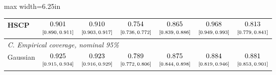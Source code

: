 \begin{table}[htbp]
\begin{adjustbox}{max width=6.25in}
\begin{tabular}{lcccccc}
HSCP & $\begin{array}{@{}c@{}}0.901\\[-1pt] \scriptstyle[0.890,\,0.911]\end{array}$ & $\begin{array}{@{}c@{}}0.910\\[-1pt] \scriptstyle[0.903,\,0.917]\end{array}$ & $\begin{array}{@{}c@{}}0.754\\[-1pt] \scriptstyle[0.736,\,0.772]\end{array}$ & $\begin{array}{@{}c@{}}0.865\\[-1pt] \scriptstyle[0.839,\,0.886]\end{array}$ & $\begin{array}{@{}c@{}}0.968\\[-1pt] \scriptstyle[0.949,\,0.993]\end{array}$ & $\begin{array}{@{}c@{}}0.813\\[-1pt] \scriptstyle[0.779,\,0.841]\end{array}$ \\
\midrule
\multicolumn{7}{l}{\textit{C. Empirical coverage, nominal 95\%}} \\
Gaussian & $\begin{array}{@{}c@{}}0.925\\[-1pt] \scriptstyle[0.915,\,0.934]\end{array}$ & $\begin{array}{@{}c@{}}0.923\\[-1pt] \scriptstyle[0.916,\,0.929]\end{array}$ & $\begin{array}{@{}c@{}}0.789\\[-1pt] \scriptstyle[0.772,\,0.806]\end{array}$ & $\begin{array}{@{}c@{}}0.875\\[-1pt] \scriptstyle[0.844,\,0.898]\end{array}$ & $\begin{array}{@{}c@{}}0.884\\[-1pt] \scriptstyle[0.819,\,0.946]\end{array}$ & $\begin{array}{@{}c@{}}0.881\\[-1pt] \scriptstyle[0.853,\,0.901]\end{array}$ \\

\end{tabular}
\end{adjustbox}
\end{table}
